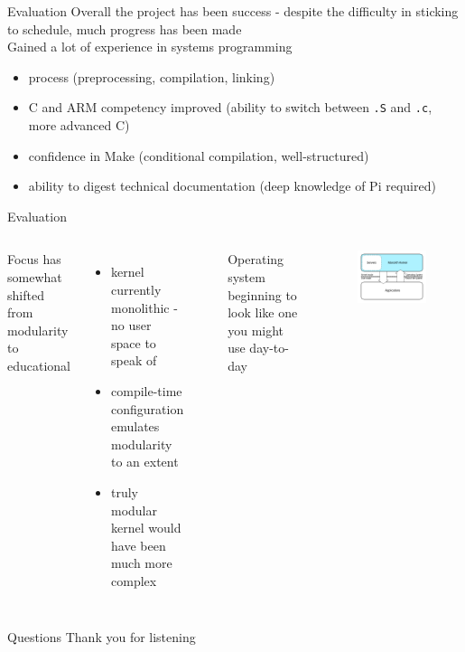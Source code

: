 \documentclass[10pt]{beamer}
\newcommand{\code}[1]{\texttt{#1}}
\begin{document}
\begin{frame}{Evaluation}
    Overall the project has been success - despite the difficulty in sticking to
    schedule, much progress has been made \\

    Gained a lot of experience in systems programming
    \begin{itemize}
        \item process (preprocessing, compilation, linking)
        \item C and ARM competency improved (ability to switch between \code{.S}
            and \code{.c}, more advanced C)
        \item confidence in Make (conditional compilation, well-structured)
        \item ability to digest technical documentation (deep knowledge of Pi
            required)
    \end{itemize}
\end{frame}

\begin{frame}{Evaluation}
    \begin{columns}
        Focus has somewhat shifted from modularity to educational
        \begin{itemize}
            \item kernel currently monolithic - no user space to speak of
            \item compile-time configuration emulates modularity to an extent
            \item truly modular kernel would have been much more complex
        \end{itemize} ~

        Operating system beginning to look like one you might use day-to-day \\

        \begin{figure}
            \centering
            \includegraphics[width=.9\textwidth]{monolithic.png}
        \end{figure}
    \end{columns}

\end{frame}

\begin{frame}{Questions}
    \centering
    Thank you for listening
\end{frame}
\end{document}
